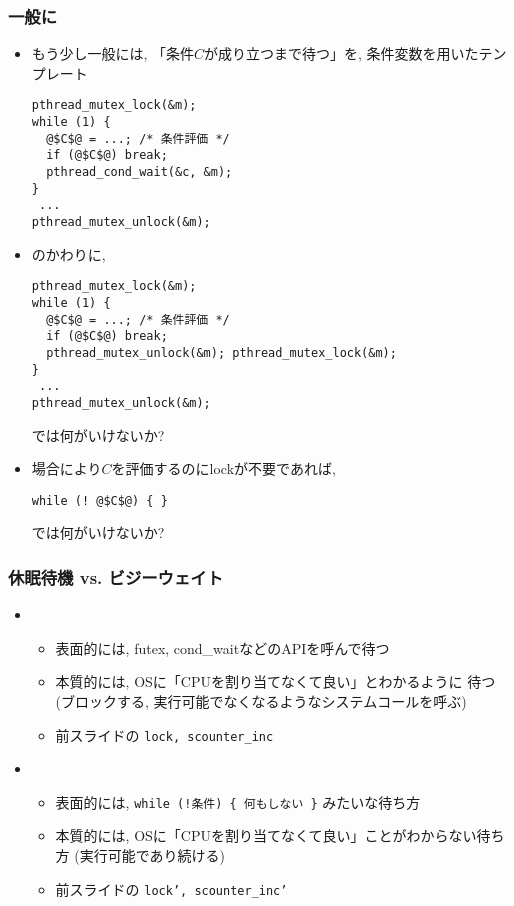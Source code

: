 \documentclass[12pt,dvipdfmx]{beamer}
\begin{document}
\begin{frame}[fragile]
  \frametitle{一般に}
  \begin{itemize}
  \item もう少し一般には, 「条件$C$が成り立つまで待つ」を,
    条件変数を用いたテンプレート
\begin{lstlisting}
pthread_mutex_lock(&m);
while (1) {
  @$C$@ = ...; /* 条件評価 */
  if (@$C$@) break;
  pthread_cond_wait(&c, &m);
}
 ...
pthread_mutex_unlock(&m);      
\end{lstlisting}
\item のかわりに,
\begin{lstlisting}
pthread_mutex_lock(&m);
while (1) {
  @$C$@ = ...; /* 条件評価 */
  if (@$C$@) break;
  pthread_mutex_unlock(&m); pthread_mutex_lock(&m);
}
 ...
pthread_mutex_unlock(&m);      
\end{lstlisting}
では何がいけないか?
\item 場合により$C$を評価するのにlockが不要であれば,
  \begin{lstlisting}
while (! @$C$@) { }
\end{lstlisting}
では何がいけないか? 
\end{itemize}
\end{frame}

\begin{frame}[fragile]
  \frametitle{休眠待機 vs. ビジーウェイト}
  \begin{itemize}
  \item {}
    \begin{itemize}
    \item 表面的には, futex, cond\_waitなどのAPIを呼んで待つ
    \item 本質的には, OSに「CPUを割り当てなくて良い」とわかるように
      待つ(ブロックする, 実行可能でなくなるようなシステムコールを呼ぶ)
    \item 前スライドの {\tt lock, scounter\_inc}
    \end{itemize}
  \item {}
    \begin{itemize}
    \item 表面的には, {\tt while (!条件) \{ 何もしない \}} みたいな待ち方
    \item 本質的には, OSに「CPUを割り当てなくて良い」ことがわからない待ち方
      (実行可能であり続ける)
    \item 前スライドの {\tt lock', scounter\_inc'}
    \end{itemize}
  \end{itemize}
\end{frame}
\end{document}
